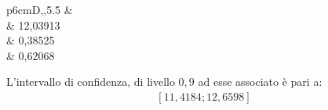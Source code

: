 \begin{savenotes}
\begin{table}[htb]
\centering
 \caption{Grandezze}
 \begin{tabular}{p{6cm}D{,}{,}{5.5}}
 \toprule
 	 &  \\
 \midrule 		
	 & 12,03913\\
 	 & 0,38525\\
 	 & 0,62068\\	
 \bottomrule
 \end{tabular} 
 \label{table:numero_medio_malattia}
\end{table}
\end{savenotes} 

L'intervallo di confidenza, di livello $0,9$ ad esse associato è pari a:
\begin{equation}
	\label{eq:intervallo_confidenza_num_malattia}
	\begin{split}
		\left [ 11,4184 ; 12,6598 \right]	 
	\end{split}
\end{equation}
